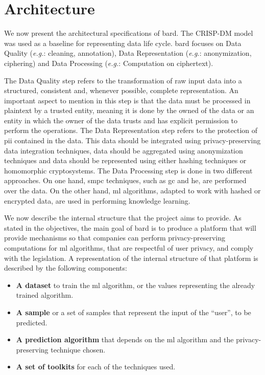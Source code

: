 
\section{Architecture}
\label{sec:Arquitecture}


We now present the architectural specifications of \ac{bard}. The CRISP-DM model was used as a baseline for representing data life cycle. \ac{bard} focuses on Data Quality (\textit{e.g.}: cleaning, annotation), Data Representation (\textit{e.g.}: anonymization, ciphering) and Data Processing (\textit{e.g.}: Computation on ciphertext).

The Data Quality step refers to the transformation of raw input data into a structured, consistent and, whenever possible, complete representation. An important aspect to mention in this step is that the data must be processed in plaintext by a trusted entity, meaning it is done by the owned of the data or an entity in which the owner of the data trusts and has explicit permission to perform the operations.
The Data Representation step refers to the protection of \ac{pii} contained in the data. This data should be integrated using privacy-preserving data integration techniques, data should be aggregated using anonymization techniques and data should be represented using either hashing techniques or homomorphic cryptosystems.
The Data Processing step is done in two different approaches. On one hand, \ac{smpc} techniques, such as \ac{gc} and \ac{he}, are performed over the data. On the other hand, \ac{ml} algorithms, adapted to work with hashed or encrypted data, are used in performing knowledge learning.

We now describe the internal structure that the project aims to provide.
As stated in the objectives, the main goal of \ac{bard} is to produce a platform that will provide mechanisms so that companies can perform privacy-preserving computations for \ac{ml} algorithms, that are respectful of user privacy, and comply with the legislation. A representation of the internal structure of that platform is described by the following components: 
\begin{itemize}
	\setlength\itemsep{1em}
	\item \textbf{A dataset} to train the \ac{ml} algorithm, or the values representing the already trained algorithm.
	\item \textbf{A sample} or a set of samples that represent the input of the ``user'', to be predicted.
	\item \textbf{A prediction algorithm} that depends on the \ac{ml} algorithm and the privacy-preserving technique chosen.
	\item \textbf{A set of toolkits} for each of the techniques used.
\end{itemize}

